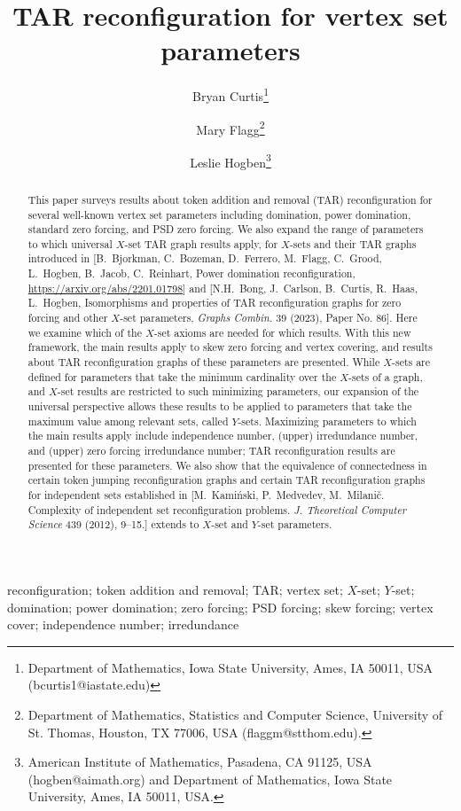 \documentclass{article}
\title{TAR reconfiguration for vertex set parameters}
\author{Bryan Curtis\thanks{Department of Mathematics, Iowa State University,
Ames, IA 50011, USA (bcurtis1@iastate.edu)}\and
Mary Flagg\thanks{Department of Mathematics, Statistics and Computer Science, University of St. Thomas, Houston, TX 77006, USA (flaggm@stthom.edu).} \and
   Leslie
Hogben\thanks{American Institute of Mathematics, Pasadena, CA 91125, USA
(hogben@aimath.org) and Department of Mathematics, Iowa State University,
Ames, IA 50011, USA.}}
\numberwithin{figure}{section}
\numberwithin{table}{section}
\numberwithin{equation}{section}
\theoremstyle{definition}
\theoremstyle{definition}
\theoremstyle{definition}
\newcommand{\noi}{\noindent}
\begin{document}

\maketitle 

\begin{abstract}  This paper  surveys results about token addition and removal (TAR) reconfiguration for several  well-known vertex set parameters including domination, power domination, standard zero forcing, and PSD zero forcing. We also expand the range of parameters to which universal $X$-set TAR graph results apply,  for  $X$-sets and their TAR graphs introduced in  [B.~Bjorkman, C.~Bozeman, D.~Ferrero, M.~Flagg, C.~Grood, L.~Hogben, B.~Jacob, C.~Reinhart,  Power domination reconfiguration,  \url{https://arxiv.org/abs/2201.01798}]  and 
 [N.H.~Bong, J.~Carlson, B.~Curtis, R.~Haas, L.~Hogben, Isomorphisms  and  properties of TAR reconfiguration graphs for zero forcing and other $X$-set parameters,  \emph{Graphs Combin.} {39} (2023), Paper No. 86].   Here we examine which of the $X$-set axioms are needed for which results.  With this new framework, the main  results apply to skew zero forcing and vertex covering, and results about TAR reconfiguration graphs of these parameters are presented.  While $X$-sets are defined for parameters that take the minimum cardinality over the $X$-sets  of a graph, and $X$-set results are restricted to such minimizing parameters, our expansion of the universal perspective allows these results to be applied to parameters that take the maximum value among relevant sets, called $Y$-sets.  Maximizing parameters to which the main results apply include independence number, (upper) irredundance number, and (upper) zero forcing irredundance number; 
 TAR reconfiguration results are presented for these parameters.  We also show that the equivalence of connectedness in certain token jumping reconfiguration graphs and certain TAR reconfiguration graphs for independent sets established in [M.~Kami\'nski, P.~Medvedev, M.~Milani\v c. Complexity of independent set reconfiguration problems. {\em J. Theoretical Computer Science} 439 (2012), 9--15.] extends to $X$-set and $Y$-set parameters.
\end{abstract}

 \noi {\bf Keywords} reconfiguration;  token addition and removal; TAR; vertex set; $X$-set;  $Y$-set; domination; power domination; zero forcing; PSD forcing; skew forcing; vertex cover; independence number; irredundance  
\end{document}
